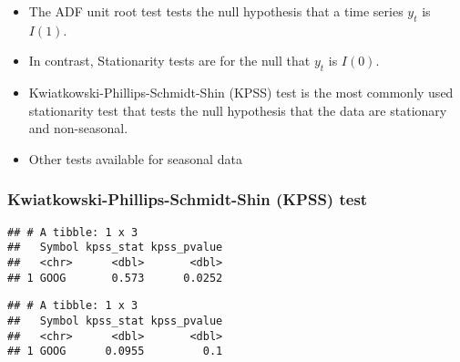 \documentclass[]{book}
\newenvironment{Shaded}{\begin{snugshade}}{\end{snugshade}}
\newcommand{\DataTypeTok}[1]{\textcolor[rgb]{0.13,0.29,0.53}{#1}}
\newcommand{\DecValTok}[1]{\textcolor[rgb]{0.00,0.00,0.81}{#1}}
\newcommand{\KeywordTok}[1]{\textcolor[rgb]{0.13,0.29,0.53}{\textbf{#1}}}
\newcommand{\NormalTok}[1]{#1}
\newcommand{\OperatorTok}[1]{\textcolor[rgb]{0.81,0.36,0.00}{\textbf{#1}}}
\newcommand{\StringTok}[1]{\textcolor[rgb]{0.31,0.60,0.02}{#1}}
\providecommand{\tightlist}{%
  \setlength{\itemsep}{0pt}\setlength{\parskip}{0pt}}
\begin{document}
\begin{itemize}
\tightlist
\item
  The ADF unit root test tests the null hypothesis that a time series \(y_t\) is \(I(1)\).
\item
  In contrast, Stationarity tests are for the null that \(y_t\) is \(I(0)\).
\item
  Kwiatkowski-Phillips-Schmidt-Shin (KPSS) test is the most commonly used stationarity test that tests the null hypothesis that the data are stationary and non-seasonal.
\item
  Other tests available for seasonal data
\end{itemize}

\hypertarget{kwiatkowski-phillips-schmidt-shin-kpss-test}{%
\subsubsection{Kwiatkowski-Phillips-Schmidt-Shin (KPSS) test}\label{kwiatkowski-phillips-schmidt-shin-kpss-test}}

\begin{Shaded}
\end{Shaded}

\begin{verbatim}
## # A tibble: 1 x 3
##   Symbol kpss_stat kpss_pvalue
##   <chr>      <dbl>       <dbl>
## 1 GOOG       0.573      0.0252
\end{verbatim}

\begin{Shaded}
\end{Shaded}

\begin{verbatim}
## # A tibble: 1 x 3
##   Symbol kpss_stat kpss_pvalue
##   <chr>      <dbl>       <dbl>
## 1 GOOG      0.0955         0.1
\end{verbatim}

\begin{Shaded}
\end{Shaded}
\end{document}
